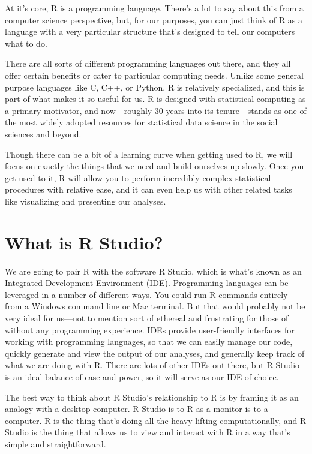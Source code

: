 \documentclass[
  letterpaper,
  DIV=11,
  numbers=noendperiod]{scrreprt}
\begin{document}

At it's core, R is a programming language. There's a lot to say about
this from a computer science perspective, but, for our purposes, you can
just think of R as a language with a very particular structure that's
designed to tell our computers what to do.

There are all sorts of different programming languages out there, and
they all offer certain benefits or cater to particular computing needs.
Unlike some general purpose languages like C, C++, or Python, R is
relatively specialized, and this is part of what makes it so useful for
us. R is designed with statistical computing as a primary motivator, and
now---roughly 30 years into its tenure---stands as one of the most
widely adopted resources for statistical data science in the social
sciences and beyond.

Though there can be a bit of a learning curve when getting used to R, we
will focus on exactly the things that we need and build ourselves up
slowly. Once you get used to it, R will allow you to perform incredibly
complex statistical procedures with relative ease, and it can even help
us with other related tasks like visualizing and presenting our
analyses.

\section*{What is R Studio?}\label{what-is-r-studio}


We are going to pair R with the software R Studio, which is what's known
as an Integrated Development Environment (IDE). Programming languages
can be leveraged in a number of different ways. You could run R commands
entirely from a Windows command line or Mac terminal. But that would
probably not be very ideal for us---not to mention sort of ethereal and
frustrating for those of without any programming experience. IDEs
provide user-friendly interfaces for working with programming languages,
so that we can easily manage our code, quickly generate and view the
output of our analyses, and generally keep track of what we are doing
with R. There are lots of other IDEs out there, but R Studio is an ideal
balance of ease and power, so it will serve as our IDE of choice.

The best way to think about R Studio's relationship to R is by framing
it as an analogy with a desktop computer. R Studio is to R as a monitor
is to a computer. R is the thing that's doing all the heavy lifting
computationally, and R Studio is the thing that allows us to view and
interact with R in a way that's simple and straightforward.
\end{document}
